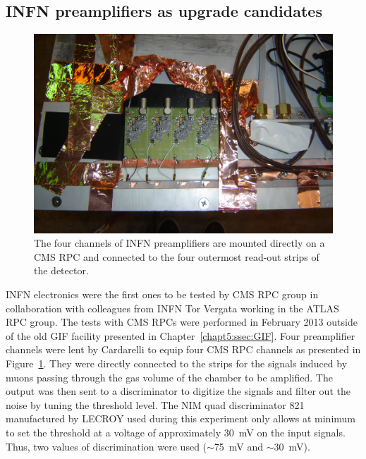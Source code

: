 	\subsection{INFN preamplifiers as upgrade candidates}
	\label{chapt6:ssec:INFN-Prelim}
	
\begingroup\setlength{\intextsep}{5pt}\setlength{\columnsep}{15pt}
	
	\begin{figure}
		\centering
		\includegraphics[width=\linewidth]{fig/chapt6/INFN-Preamp-2013.JPG}
		\caption{\label{fig:INFN-preamp} The four channels of INFN preamplifiers are mounted directly on a CMS RPC and connected to the four outermost read-out strips of the detector.}
	\end{figure}
	
	INFN electronics were the first ones to be tested by CMS RPC group in collaboration with colleagues from INFN Tor Vergata working in the ATLAS RPC group. The tests with CMS RPCs were performed in February 2013 outside of the old GIF facility presented in Chapter~\ref{chapt5:ssec:GIF}. Four preamplifier channels were lent by Cardarelli to equip four CMS RPC channels as presented in Figure~\ref{fig:INFN-preamp}. They were directly connected to the strips for the signals induced by muons passing through the gas volume of the chamber to be amplified. The output was then sent to a discriminator to digitize the signals and filter out the noise by tuning the threshold level. The NIM quad discriminator 821 manufactured by LECROY used during this experiment only allows at minimum to set the threshold at a voltage of approximately \SI{30}{mV} on the input signals. Thus, two values of discrimination were used ($\sim$\SI{75}{mV} and $\sim$\SI{30}{mV}).
	
